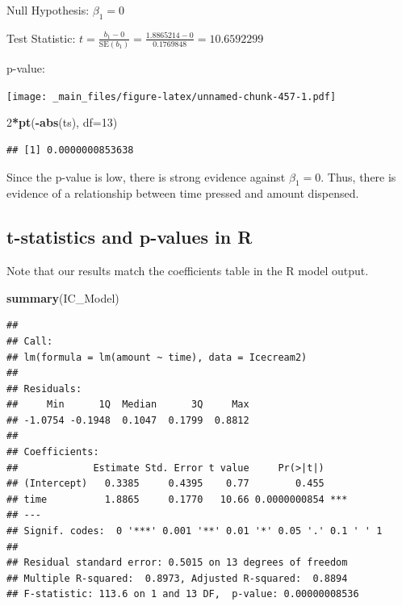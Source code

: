 \documentclass[]{book}
\newenvironment{Shaded}{\begin{snugshade}}{\end{snugshade}}
\newcommand{\KeywordTok}[1]{\textcolor[rgb]{0.13,0.29,0.53}{\textbf{#1}}}
\newcommand{\DataTypeTok}[1]{\textcolor[rgb]{0.13,0.29,0.53}{#1}}
\newcommand{\DecValTok}[1]{\textcolor[rgb]{0.00,0.00,0.81}{#1}}
\newcommand{\StringTok}[1]{\textcolor[rgb]{0.31,0.60,0.02}{#1}}
\newcommand{\OperatorTok}[1]{\textcolor[rgb]{0.81,0.36,0.00}{\textbf{#1}}}
\newcommand{\NormalTok}[1]{#1}
\begin{document}
Null Hypothesis: \(\beta_1=0\)

Test Statistic:
\(t=\frac{b_1-0}{\text{SE}(b_1)}=\frac{1.8865214 - 0 }{0.1769848} = 10.6592299\)

p-value:

\begin{Shaded}
\end{Shaded}

\texttt{[image: \_main\_files/figure-latex/unnamed-chunk-457-1.pdf]}

\begin{Shaded}
\begin{Highlighting}[]
\DecValTok{2}\OperatorTok{*}\KeywordTok{pt}\NormalTok{(}\OperatorTok{-}\KeywordTok{abs}\NormalTok{(ts), }\DataTypeTok{df=}\DecValTok{13}\NormalTok{)}
\end{Highlighting}
\end{Shaded}

\begin{verbatim}
## [1] 0.0000000853638
\end{verbatim}

Since the p-value is low, there is strong evidence against
\(\beta_1=0\). Thus, there is evidence of a relationship between time
pressed and amount dispensed.

\subsection{t-statistics and p-values in
R}\label{t-statistics-and-p-values-in-r}

Note that our results match the coefficients table in the R model
output.

\begin{Shaded}
\begin{Highlighting}[]
\KeywordTok{summary}\NormalTok{(IC_Model)}
\end{Highlighting}
\end{Shaded}

\begin{verbatim}
## 
## Call:
## lm(formula = lm(amount ~ time), data = Icecream2)
## 
## Residuals:
##     Min      1Q  Median      3Q     Max 
## -1.0754 -0.1948  0.1047  0.1799  0.8812 
## 
## Coefficients:
##             Estimate Std. Error t value     Pr(>|t|)    
## (Intercept)   0.3385     0.4395    0.77        0.455    
## time          1.8865     0.1770   10.66 0.0000000854 ***
## ---
## Signif. codes:  0 '***' 0.001 '**' 0.01 '*' 0.05 '.' 0.1 ' ' 1
## 
## Residual standard error: 0.5015 on 13 degrees of freedom
## Multiple R-squared:  0.8973, Adjusted R-squared:  0.8894 
## F-statistic: 113.6 on 1 and 13 DF,  p-value: 0.00000008536
\end{verbatim}
\end{document}
